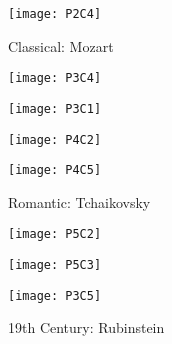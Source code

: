 \begin{figure}[h]
\caption{Classical: Mozart}
\centering
\texttt{[image: P2C4]}
\end{figure}

\begin{figure}[h]
\begin{minipage}{.5\textwidth}
  \centering
  \texttt{[image: P3C4]}
  \label{fig:test2}
\end{minipage}
\begin{minipage}{.5\textwidth}
  \centering
  \texttt{[image: P3C1]}
  \label{fig:test1}
\end{minipage}
\end{figure}

\begin{figure}[h]
\begin{minipage}{.5\textwidth}
  \centering
  \texttt{[image: P4C2]}
  \label{fig:test2}
\end{minipage}
\begin{minipage}{.5\textwidth}
\caption{Romantic: Tchaikovsky}
\centering
\texttt{[image: P4C5]}
 \label{fig:test3}
\end{minipage}
\end{figure}

\begin{figure}[h]
\begin{minipage}{.5\textwidth}
  \centering
  \texttt{[image: P5C2]}
  \label{fig:test2}
\end{minipage}
\begin{minipage}{.5\textwidth}
  \centering
  \texttt{[image: P5C3]}
  \label{fig:test1}
\end{minipage}
\end{figure}

\begin{figure}[h]
\caption{19th Century: Rubinstein}
\centering
\texttt{[image: P3C5]}
\end{figure}